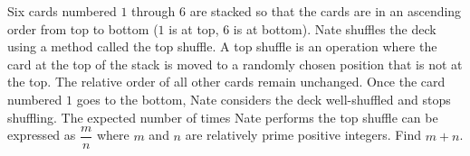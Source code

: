 Six cards numbered $1$ through $6$ are stacked so that the cards are in an ascending order from top to bottom ($1$ is at top, $6$ is at bottom). Nate shuffles the deck using a method called the top shuffle. A top shuffle is an operation where the card at the top of the stack is moved to a randomly chosen position that is not at the top. The relative order of all other cards remain unchanged. Once the card numbered $1$ goes to the bottom, Nate considers the deck well-shuffled and stops shuffling. The expected number of times Nate performs the top shuffle can be expressed as $\dfrac{m}{n}$ where $m$ and $n$ are relatively prime positive integers. Find $m + n$.
